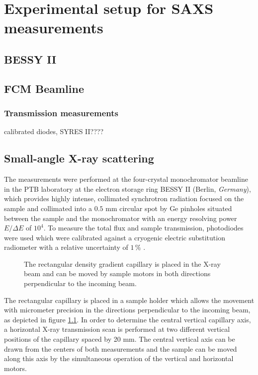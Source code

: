 \chapter{Experimental setup for SAXS measurements}
\label{chap:experimental_setup}

\section{BESSY II}

\section{FCM Beamline}
\subsection{Transmission measurements}
calibrated diodes, SYRES II????

\section{Small-angle X-ray scattering}
The measurements were performed at the four-crystal monochromator beamline in the PTB laboratory at the electron storage ring BESSY II (Berlin, \emph{Germany}), which provides highly intense, collimated synchrotron radiation focused on the sample and collimated into a \(0.5\) mm circular spot by Ge pinholes situated between the sample and the monochromator with an energy resolving
power \( E/\Delta E \) of \( 10^4 \). To measure the total flux and sample transmission, photodiodes were used which were calibrated against a cryogenic electric substitution radiometer with a relative uncertainty of \( 1\,\% \) \cite{krumrey_high-accuracy_2001-2}.


\begin{figure}%
	\centering
		
		\caption{The rectangular density gradient capillary is placed in the X-ray beam and can be moved by sample motors in both directions perpendicular to the incoming beam.}
		\label{fig:DensityGradientCapillarySetup}
\end{figure}

The rectangular capillary is placed in a sample holder which allows the movement with micrometer precision in the directions perpendicular to the incoming beam, as depicted in figure \ref{fig:DensityGradientCapillarySetup}. In order to determine the central vertical capillary axis, a horizontal X-ray transmission scan is performed at two different vertical positions of the capillary spaced by 20 mm. The central vertical axis can be drawn from the centers of both measurements and the sample can be moved along this axis by the simultaneous operation of the vertical and horizontal motors.

